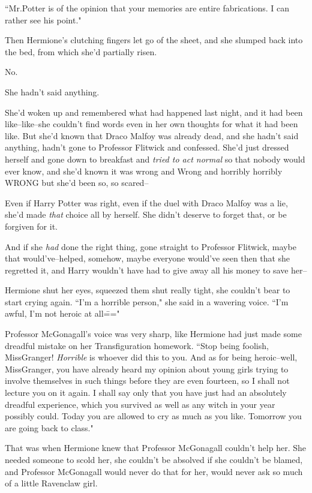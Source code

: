 ``Mr.\?Potter is of the opinion that your memories are entire fabrications. I can rather see his point."

Then Hermione's clutching fingers let go of the sheet, and she slumped back into the bed, from which she'd partially risen.

No.

She hadn't said anything.

She'd woken up and remembered what had happened last night, and it had been like\---like\---she couldn't find words even in her own thoughts for what it had been like. But she'd known that Draco Malfoy was already dead, and she hadn't said anything, hadn't gone to Professor Flitwick and confessed. She'd just dressed herself and gone down to breakfast and \emph{tried to act normal} so that nobody would ever know, and she'd known it was wrong and Wrong and horribly horribly WRONG but she'd been so, so scared\---

Even if Harry Potter was right, even if the duel with Draco Malfoy was a lie, she'd made \emph{that} choice all by herself. She didn't deserve to forget that, or be forgiven for it.

And if she \emph{had} done the right thing, gone straight to Professor Flitwick, maybe that would've\---helped, somehow, maybe everyone would've seen then that she regretted it, and Harry wouldn't have had to give away all his money to save her\---

Hermione shut her eyes, squeezed them shut really tight, she couldn't bear to start crying again. ``I'm a horrible person," she said in a wavering voice. ``I'm awful, I'm not heroic at all\==="

Professor McGonagall's voice was very sharp, like Hermione had just made some dreadful mistake on her Transfiguration homework. ``Stop being foolish, Miss\?Granger! \emph{Horrible} is whoever did this to you. And as for being heroic\---well, Miss\?Granger, you have already heard my opinion about young girls trying to involve themselves in such things before they are even fourteen, so I shall not lecture you on it again. I shall say only that you have just had an absolutely dreadful experience, which you survived as well as any witch in your year possibly could. Today you are allowed to cry as much as you like. Tomorrow you are going back to class."

That was when Hermione knew that Professor McGonagall couldn't help her. She needed someone to scold her, she couldn't be absolved if she couldn't be blamed, and Professor McGonagall would never do that for her, would never ask so much of a little Ravenclaw girl.

